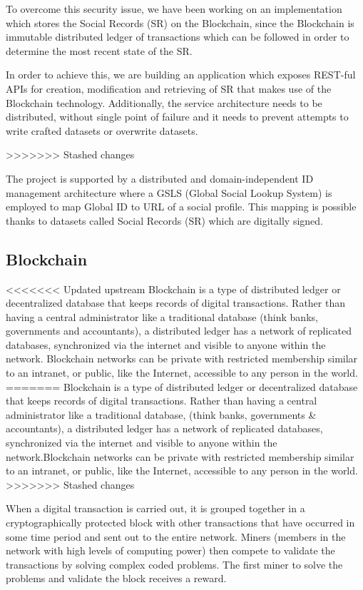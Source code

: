 To overcome this security issue, we have been working on an implementation which stores the Social Records (SR) on the Blockchain, since the Blockchain is immutable distributed ledger of transactions which can be followed in order to determine the most recent state of the SR.

In order to achieve this, we are building an application which exposes REST-ful APIs for creation, modification and retrieving of SR that makes use of the Blockchain technology. Additionally, the service architecture needs to be distributed, without single point of failure and it needs to prevent attempts to write crafted datasets or overwrite datasets.

>>>>>>> Stashed changes

The project is supported by a distributed and domain-independent ID management architecture where a GSLS (Global Social Lookup System) is employed to map Global ID to URL of a social profile. This mapping is possible thanks to datasets called Social Records (SR) which are digitally signed.

\subsection{Blockchain}
<<<<<<< Updated upstream
Blockchain is a type of distributed ledger or decentralized database that keeps records of digital transactions. Rather than having a central administrator like a traditional database (think banks, governments and accountants), a distributed ledger has a network of replicated databases, synchronized via the internet and visible to anyone within the network. Blockchain networks can be private with restricted membership similar to an intranet, or public, like the Internet, accessible to any person in the world.
=======
Blockchain is a type of distributed ledger or decentralized database that keeps records of digital transactions. Rather than having a central administrator like a traditional database, (think banks, governments \& accountants), a distributed ledger has a network of replicated databases, synchronized via the internet and visible to anyone within the network.Blockchain networks can be private with restricted membership similar to an intranet, or public, like the Internet, accessible to any person in the world.
>>>>>>> Stashed changes

When a digital transaction is carried out, it is grouped together in a cryptographically protected block with other transactions that have occurred in some time period and sent out to the entire network. Miners (members in the network with high levels of computing power) then compete to validate the transactions by solving complex coded problems. The first miner to solve the problems and validate the block receives a reward.

